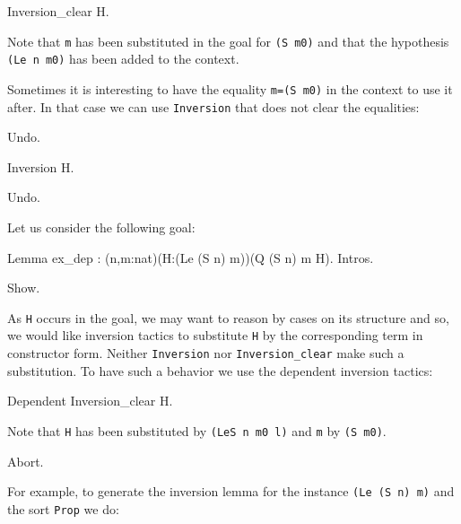 \begin{coq_example*}
\begin{coq_example}
Inversion_clear  H.
\end{coq_example}

Note that \texttt{m} has been substituted in the goal for \texttt{(S m0)}
and that the hypothesis \texttt{(Le n m0)} has been added to the
context.

Sometimes it is
interesting to have the equality \texttt{m=(S m0)} in the
context to use it after. In that case we can use  \texttt{Inversion} that
does not clear the equalities:

\begin{coq_example*}
Undo.
\end{coq_example*}

\begin{coq_example}
Inversion H.
\end{coq_example}

\begin{coq_eval}
Undo.
\end{coq_eval}


Let us consider the following goal:

\begin{coq_eval}
Lemma ex_dep : (n,m:nat)(H:(Le (S n) m))(Q (S n) m H).
Intros.
\end{coq_eval}

\begin{coq_example}
Show.
\end{coq_example}

As \texttt{H} occurs in the goal, we may want to reason by cases on its
structure and so, we would like  inversion tactics to
substitute \texttt{H} by the corresponding term in constructor form. 
Neither \texttt{Inversion} nor  {\tt Inversion\_clear} make such a
substitution. 
To have such a behavior we use the dependent inversion tactics:

\begin{coq_example}
Dependent Inversion_clear H.
\end{coq_example}

Note that \texttt{H} has been substituted by \texttt{(LeS n m0 l)} and
\texttt{m} by \texttt{(S m0)}.


\begin{coq_eval}
Abort.
\end{coq_eval}

For example, to generate the inversion lemma for the instance
\texttt{(Le (S n) m)} and the sort \texttt{Prop} we do:


\end{coq_example*}
